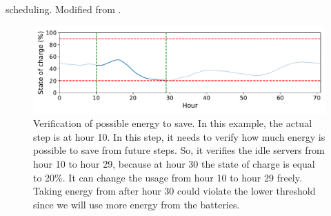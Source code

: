 \IncMargin{1em}
\begin{algorithm}[!htb]
    \LinesNumbered
    \footnotesize
    \SetAlgoLined
    \caption{\emph{\systemName} scheduling. Modified from \cite{lelong2018tuning}.}
    \label{alg:algo_scheduling_heuristic}
\end{algorithm}
\DecMargin{1em}

\begin{figure}[!htb]
    \centering
    \includegraphics[scale=0.5]{Images/Heuristic/idle_machines.pdf}
    \caption{Verification of possible energy to save. In this example, the actual step is at hour 10. In this step, it needs to verify how much energy is possible to save from future steps. So, it verifies the idle servers from hour 10 to hour 29, because at hour 30 the state of charge is equal to 20\%. It can change the usage from hour 10 to hour 29 freely. Taking energy from after hour 30 could violate the lower threshold since we will use more energy from the batteries.}
    \label{fig:idle_machines_verification}
\end{figure}

